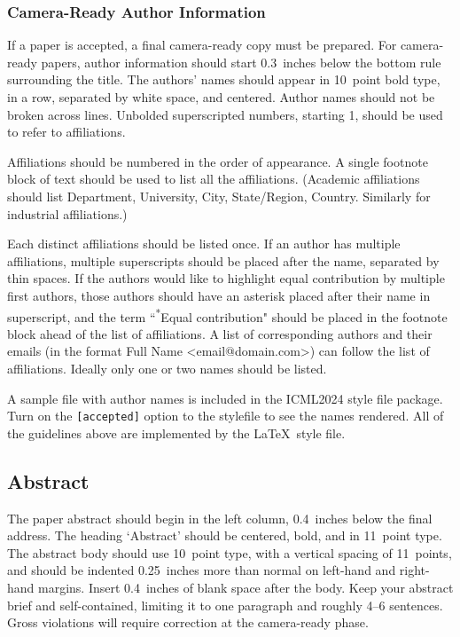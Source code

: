 \documentclass{article}
\theoremstyle{plain}
\theoremstyle{definition}
\theoremstyle{remark}
\begin{document}
\subsubsection{Camera-Ready Author Information}
\label{final author}

If a paper is accepted, a final camera-ready copy must be prepared.
%
For camera-ready papers, author information should start 0.3~inches below the
bottom rule surrounding the title. The authors' names should appear in 10~point
bold type, in a row, separated by white space, and centered. Author names should
not be broken across lines. Unbolded superscripted numbers, starting 1, should
be used to refer to affiliations.

Affiliations should be numbered in the order of appearance. A single footnote
block of text should be used to list all the affiliations. (Academic
affiliations should list Department, University, City, State/Region, Country.
Similarly for industrial affiliations.)

Each distinct affiliations should be listed once. If an author has multiple
affiliations, multiple superscripts should be placed after the name, separated
by thin spaces. If the authors would like to highlight equal contribution by
multiple first authors, those authors should have an asterisk placed after their
name in superscript, and the term ``\textsuperscript{*}Equal contribution"
should be placed in the footnote block ahead of the list of affiliations. A
list of corresponding authors and their emails (in the format Full Name
\textless{}email@domain.com\textgreater{}) can follow the list of affiliations.
Ideally only one or two names should be listed.

A sample file with author names is included in the ICML2024 style file
package. Turn on the \texttt{[accepted]} option to the stylefile to
see the names rendered. All of the guidelines above are implemented
by the \LaTeX\ style file.

\subsection{Abstract}

The paper abstract should begin in the left column, 0.4~inches below the final
address. The heading `Abstract' should be centered, bold, and in 11~point type.
The abstract body should use 10~point type, with a vertical spacing of
11~points, and should be indented 0.25~inches more than normal on left-hand and
right-hand margins. Insert 0.4~inches of blank space after the body. Keep your
abstract brief and self-contained, limiting it to one paragraph and roughly 4--6
sentences. Gross violations will require correction at the camera-ready phase.
\end{document}
